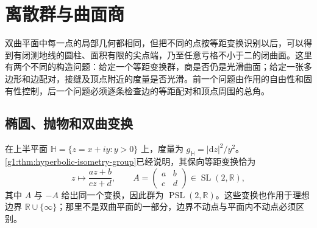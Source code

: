 
% 
% 

\section{离散群与曲面商}
\label{g1:sec:1002}

双曲平面中每一点的局部几何都相同，但把不同的点按等距变换识别以后，可以得到有闭测地线的圆柱、面积有限的尖点端，乃至任意亏格不小于二的闭曲面。这里有两个不同的构造问题：给定一个等距变换群，商是否仍是光滑曲面；给定一张多边形和边配对，接缝及顶点附近的度量是否光滑。前一个问题由作用的自由性和固有性控制，后一个问题必须逐条检查边的等距配对和顶点周围的总角。

\subsection{椭圆、抛物和双曲变换}
\label{g1:subsec:1002:01}

在上半平面 \(\mathbb H=\{z=x+iy:y>0\}\) 上，度量为 \(g_{\mathbb H}=|\mathrm{d}z|^2/y^2\)。\cref{g1:thm:hyperbolic-isometry-group}已经说明，其保向等距变换恰为
\[
	z\longmapsto\frac{az+b}{cz+d},\qquad
	A=\begin{pmatrix}a&b\\c&d\end{pmatrix}\in\operatorname{SL}(2,\mathbb R),
\]
其中 \(A\) 与 \(-A\) 给出同一个变换，因此群为 \(\operatorname{PSL}(2,\mathbb R)\)。这些变换也作用于理想边界 \(\mathbb R\cup\{\infty\}\)；那里不是双曲平面的一部分，边界不动点与平面内不动点必须区别。


